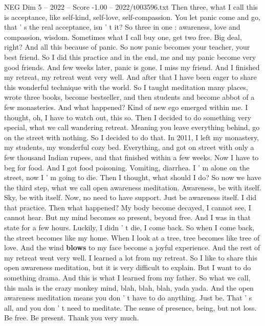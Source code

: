 \begin{textsample}{NEG Dim 5 – 2022 – Score -1.00 – 2022/t003596.txt}
Then three, what I call this is acceptance, like self-kind, self-love, self-compassion.
You let panic come and go, that ' s the real acceptance, isn ' t it?
So three in one : awareness, love and compassion, wisdom.
Sometimes what I call buy one, get two free.
Big deal, right?
And all this because of panic.
So now panic becomes your teacher, your best friend.
So I did this practice and in the end, me and my panic become very good friends.
And few weeks later, panic is gone.
I miss my friend.
And I finished my retreat, my retreat went very well.
And after that I have been eager to share this wonderful technique with the world.
So I taught meditation many places, wrote three books, become bestseller, and then students and become abbot of a few monasteries.
And what happened?
Kind of new ego emerged within me.
I thought, oh, I have to watch out, this so.
Then I decided to do something very special, what we call wandering retreat.
Meaning you leave everything behind, go on the street with nothing.
So I decided to do that.
In 2011, I left my monastery, my students, my wonderful cozy bed.
Everything, and got on street with only a few thousand Indian rupees, and that finished within a few weeks.
Now I have to beg for food.
And I got food poisoning.
Vomiting, diarrhea.
I ' m alone on the street, now I ' m going to die.
Then I thought, what should I do?
So now we have the third step, what we call open awareness meditation.
Awareness, be with itself.
Sky, be with itself.
Now, no need to have support.
Just be awareness itself.
I did that practice.
Then what happened?
My body become decayed, I cannot see, I cannot hear.
But my mind becomes so present, beyond free.
And I was in that state for a few hours.
Luckily, I didn ' t die, I come back.
So when I come back, the street becomes like my home.
When I look at a tree, tree becomes like tree of love.
And the wind \textbf{blows} to my face become a joyful experience.
And the rest of my retreat went very well.
I learned a lot from my retreat.
So I like to share this open awareness meditation, but it is very difficult to explain.
But I want to do something drama.
And this is what I learned from my father.
So what we call, this mala is the crazy monkey mind, blah, blah, blah, yada yada.
And the open awareness meditation means you don ' t have to do anything.
Just be.
That ' s all, and you don ' t need to meditate.
The sense of presence, being, but not loss.
Be free.
Be present.
Thank you very much.

\end{textsample}
